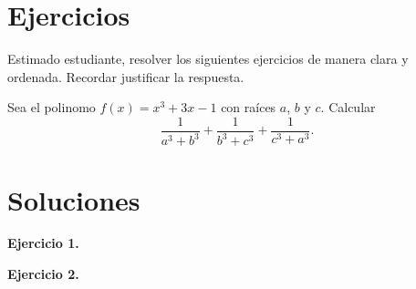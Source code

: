 \section*{\large Ejercicios}

Estimado estudiante, resolver los siguientes ejercicios de manera clara y ordenada. Recordar justificar la respuesta.

\begin{exercise}

\end{exercise}

\begin{exercise}
    Sea el polinomo $f(x) = x^3 + 3x - 1$ con raíces $a$, $b$ y $c$.
    Calcular
    \[\frac{1}{a^3 + b^3} + \frac{1}{b^3 + c^3} + \frac{1}{c^3 + a^3}.\]
\end{exercise}


\newpage

\section*{\large Soluciones}
{
    \textbf{Ejercicio 1.}

    \textbf{Ejercicio 2.}

}\label{sec:large-soluciones}\label{sec:soluciones}
